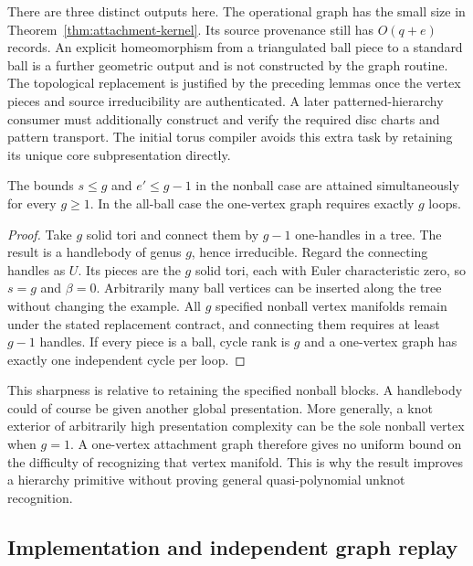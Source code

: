 There are three distinct outputs here.  The operational graph has the
small size in Theorem~\ref{thm:attachment-kernel}.  Its source provenance
still has $O(q+e)$ records.  An explicit homeomorphism from a triangulated
ball piece to a standard ball is a further geometric output and is not
constructed by the graph routine.  The topological replacement is
justified by the preceding lemmas once the vertex pieces and source
irreducibility are authenticated.  A later patterned-hierarchy consumer
must additionally construct and verify the required disc charts and
pattern transport.  The initial torus compiler avoids this extra task by
retaining its unique core subpresentation directly.

\begin{proposition}
\label{prop:kernel-sharp}
The bounds $s\leq g$ and $e'\leq g-1$ in the nonball case are attained
simultaneously for every $g\geq1$.  In the all-ball case the one-vertex
graph requires exactly $g$ loops.
\end{proposition}
\begin{proof}
Take $g$ solid tori and connect them by $g-1$ one-handles in a tree.  The
result is a handlebody of genus $g$, hence irreducible.  Regard the
connecting handles as $U$.  Its pieces are the $g$ solid tori, each with
Euler characteristic zero, so $s=g$ and $\beta=0$.  Arbitrarily many ball
vertices can be inserted along the tree without changing the example.
All $g$ specified nonball vertex manifolds remain under the stated
replacement contract, and connecting them requires at least $g-1$
handles.  If every piece is a ball, cycle rank is $g$ and a one-vertex
graph has exactly one independent cycle per loop.
\end{proof}

This sharpness is relative to retaining the specified nonball blocks.  A
handlebody could of course be given another global presentation.  More
generally, a knot exterior of arbitrarily high presentation complexity can
be the sole nonball vertex when $g=1$.  A one-vertex attachment graph
therefore gives no uniform bound on the difficulty of recognizing that
vertex manifold.  This is why the result improves a hierarchy primitive
without proving general quasi-polynomial unknot recognition.

\subsection{Implementation and independent graph replay}


